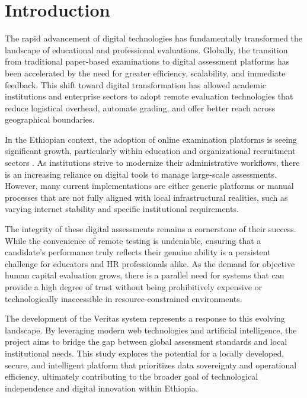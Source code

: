 \section{Introduction}

The rapid advancement of digital technologies has fundamentally transformed the landscape of educational and professional evaluations. Globally, the transition from traditional paper-based examinations to digital assessment platforms has been accelerated by the need for greater efficiency, scalability, and immediate feedback. This shift toward digital transformation has allowed academic institutions and enterprise sectors to adopt remote evaluation technologies that reduce logistical overhead, automate grading, and offer better reach across geographical boundaries.

In the Ethiopian context, the adoption of online examination platforms is seeing significant growth, particularly within education and organizational recruitment sectors . As institutions strive to modernize their administrative workflows, there is an increasing reliance on digital tools to manage large-scale assessments. However, many current implementations are either generic platforms or manual processes that are not fully aligned with local infrastructural realities, such as varying internet stability and specific institutional requirements.

The integrity of these digital assessments remains a cornerstone of their success. While the convenience of remote testing is undeniable, ensuring that a candidate’s performance truly reflects their genuine ability is a persistent challenge for educators and HR professionals alike. As the demand for objective human capital evaluation grows, there is a parallel need for systems that can provide a high degree of trust without being prohibitively expensive or technologically inaccessible in resource-constrained environments.

The development of the Veritas system represents a response to this evolving landscape. By leveraging modern web technologies and artificial intelligence, the project aims to bridge the gap between global assessment standards and local institutional needs. This study explores the potential for a locally developed, secure, and intelligent platform that prioritizes data sovereignty and operational efficiency, ultimately contributing to the broader goal of technological independence and digital innovation within Ethiopia.



